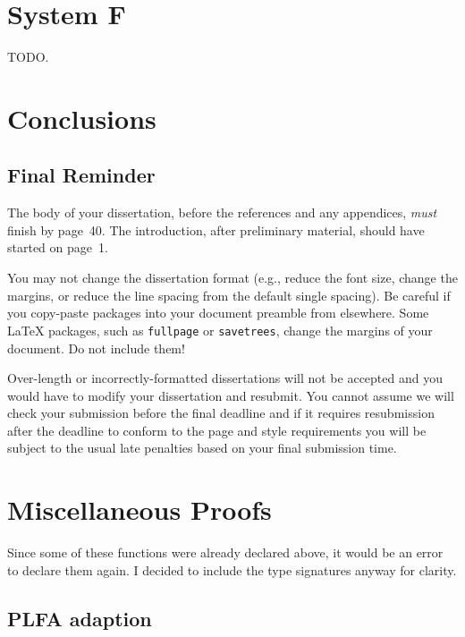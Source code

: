 \documentclass[logo,bsc,singlespacing,parskip,online]{infthesis}
\begin{document}
\chapter{System F}
TODO.

\chapter{Conclusions}

\section{Final Reminder}

The body of your dissertation, before the references and any appendices,
\emph{must} finish by page~40. The introduction, after preliminary material,
should have started on page~1.

You may not change the dissertation format (e.g., reduce the font size, change
the margins, or reduce the line spacing from the default single spacing). Be
careful if you copy-paste packages into your document preamble from elsewhere.
Some \LaTeX{} packages, such as \texttt{fullpage} or \texttt{savetrees}, change
the margins of your document. Do not include them!

Over-length or incorrectly-formatted dissertations will not be accepted and you
would have to modify your dissertation and resubmit. You cannot assume we will
check your submission before the final deadline and if it requires resubmission
after the deadline to conform to the page and style requirements you will be
subject to the usual late penalties based on your final submission time.





\appendix

\chapter{Miscellaneous Proofs}
\label{appendix:misc_proofs}

Since some of these functions were already declared above, it would be an error to declare them
again. I decided to include the type signatures anyway for clarity.

\section{PLFA adaption}

\end{document}
